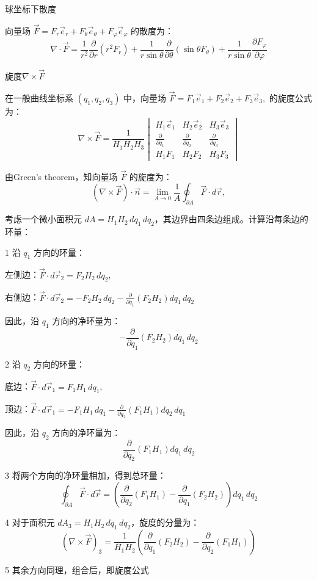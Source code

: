 \documentclass[12pt, a4paper, oneside, UTF8]{ctexbook}  %
\begin{document}
\begin{example}
    球坐标下散度
    
    向量场 \(\vec{F} = F_r \vec{e}_r + F_\theta \vec{e}_\theta + F_\varphi \vec{e}_\varphi\) 的散度为：
    \[
    \nabla \cdot \vec{F} = \frac{1}{r^2} \frac{\partial}{\partial r} (r^2 F_r) + \frac{1}{r \sin \theta} \frac{\partial}{\partial \theta} (\sin \theta F_\theta) + \frac{1}{r \sin \theta} \frac{\partial F_\varphi}{\partial \varphi}
    \]
\end{example}
\begin{defn}
    旋度$\nabla\times\vec{F}$

    在一般曲线坐标系 \((q_1, q_2, q_3)\) 中，向量场
    $
    \vec{F} = F_1 \vec{e}_1 + F_2 \vec{e}_2 + F_3 \vec{e}_3,
    $
    的旋度公式为：
    \[
    \nabla \times \vec{F} = \frac{1}{H_1 H_2 H_3}
    \begin{vmatrix}
    H_1 \vec{e}_1 & H_2 \vec{e}_2 & H_3 \vec{e}_3 \\
    \frac{\partial}{\partial q_1} & \frac{\partial}{\partial q_2} & \frac{\partial}{\partial q_3} \\
    H_1 F_1 & H_2 F_2 & H_3 F_3
    \end{vmatrix}
    \]
    \begin{tui}
        由Green's theorem，知向量场 \(\vec{F}\) 的旋度为：
    \[
(\nabla \times \vec{F}) \cdot \vec{n} = \lim_{A \to 0} \frac{1}{A} \oint_{\partial A} \vec{F} \cdot d\vec{r},
    \]

    考虑一个微小面积元 \(dA = H_1 H_2 \, dq_1 \, dq_2\)，其边界由四条边组成。计算沿每条边的环量：

    1 沿 \(q_1\) 方向的环量：

       左侧边：\(\vec{F} \cdot d\vec{r}_2 = F_2 H_2 \, dq_2\),

       右侧边：\(\vec{F} \cdot d\vec{r}_2 = -F_2 H_2 \, dq_2 - \frac{\partial}{\partial q_1} (F_2 H_2) dq_1 \, dq_2\)
    
       因此，沿 \(q_1\) 方向的净环量为：
       \[
       -\frac{\partial}{\partial q_1} (F_2 H_2) dq_1 \, dq_2
       \]
    
    2 沿 \(q_2\) 方向的环量：

       底边：\(\vec{F} \cdot d\vec{r}_1 = F_1 H_1 \, dq_1\),

       顶边：\(\vec{F} \cdot d\vec{r}_1 = -F_1 H_1 \, dq_1 - \frac{\partial}{\partial q_2} (F_1 H_1) dq_2 \, dq_1\)
    
       因此，沿 \(q_2\) 方向的净环量为：
       \[
       \frac{\partial}{\partial q_2} (F_1 H_1) dq_1 \, dq_2
       \]
    
    3 将两个方向的净环量相加，得到总环量：
       \[
       \oint_{\partial A} \vec{F} \cdot d\vec{r} = \left( \frac{\partial}{\partial q_2} (F_1 H_1) - \frac{\partial}{\partial q_1} (F_2 H_2) \right) dq_1 \, dq_2
       \]

    4 对于面积元 \(dA_3 = H_1 H_2 \, dq_1 \, dq_2\)，旋度的分量为：
       \[
       (\nabla \times \vec{F})_3 = \frac{1}{H_1 H_2} \left( \frac{\partial}{\partial q_1} (F_2 H_2) - \frac{\partial}{\partial q_2} (F_1 H_1) \right)
       \]

    5 其余方向同理，组合后，即旋度公式
    \end{tui}

\end{defn}
\end{document}
